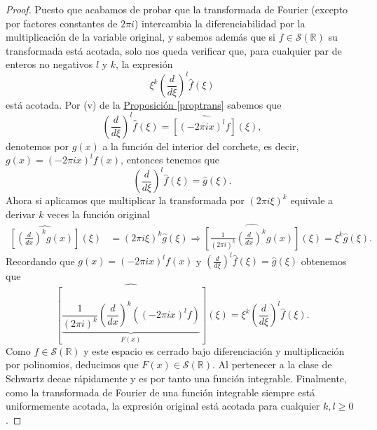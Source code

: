 \documentclass[12pt]{article}
\newcommand{\Sc}{\mathcal{S}(\mathbb{R})}
\theoremstyle{plain}
\theoremstyle{definition}
\numberwithin{equation}{section}
\begin{document}
           \begin{proof}
               Puesto que acabamos de probar que la transformada de Fourier (excepto por factores constantes de \(2\pi i\)) intercambia la diferenciabilidad por la multiplicación de la variable original, y sabemos además que si \(f \in \Sc\) su transformada está acotada, solo nos queda verificar que, para cualquier par de enteros no negativos \(l\) y \(k\), la expresión 
               $$ \xi^k \left(\frac{d}{d\xi}\right)^l \hat{f}(\xi) $$ 
               está acotada.
               Por (v) de la \hyperref[proptrans]{Proposición \ref*{proptrans}} sabemos que 
               $$ \left(\frac{d}{d\xi}\right)^l \hat{f}(\xi) = \widehat{[(-2\pi i x)^l f]}(\xi), $$ 
               denotemos por $g(x)$ a la función del interior del corchete, es decir, $g(x) = (-2\pi i x)^l f(x)$, entonces tenemos que
               $$ \left(\frac{d}{d\xi}\right)^l \hat{f}(\xi) = \hat{g}(\xi). $$ 
               Ahora si aplicamos que multiplicar la transformada por \((2\pi i \xi)^k\) equivale a derivar \(k\) veces la función original
               \begin{align*}
                   \widehat{\left[ \left(\frac{d}{dx}\right)^k g(x) \right]}(\xi) &= (2\pi i \xi)^k \hat{g}(\xi) \Rightarrow \widehat{\left[\frac{1}{(2\pi i)^k} \left(\frac{d}{dx}\right)^k g(x) \right]}(\xi) = \xi^k \hat{g}(\xi).
               \end{align*}
               Recordando que \(g(x) = (-2\pi i x)^l f(x)\) y \(\left(\frac{d}{d\xi}\right)^l \hat{f}(\xi) = \hat{g}(\xi)\) obtenemos que $$\widehat{ \left[ \underbrace{  \frac{1}{(2\pi i)^k} \left(\frac{d}{dx}\right)^k ((-2\pi i x)^l f)}_{F(x)} \right] }(\xi) = \xi^k \left(\frac{d}{d\xi}\right)^l \hat{f}(\xi).$$
               Como \(f \in \Sc\) y este espacio es cerrado bajo diferenciación y multiplicación por polinomios, deducimos que \(F(x) \in \Sc\). Al pertenecer a la clase de Schwartz decae rápidamente y es por tanto una función integrable. Finalmente, como la transformada de Fourier de una función integrable siempre está uniformemente acotada, la expresión original está acotada para cualquier \(k,l \ge 0\).
           \end{proof}
\end{document}
